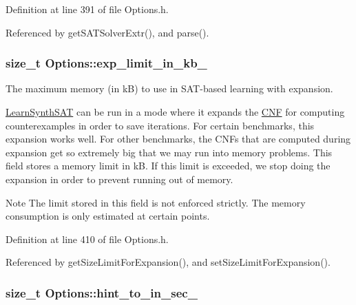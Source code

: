 Definition at line 391 of file Options.\-h.



Referenced by get\-S\-A\-T\-Solver\-Extr(), and parse().

\hypertarget{classOptions_a725d5329592e1dba55eb6a446807b3ce}{
\subsubsection[{exp\-\_\-limit\-\_\-in\-\_\-kb\-\_\-}]{\setlength{\rightskip}{0pt plus 5cm}size\-\_\-t Options\-::exp\-\_\-limit\-\_\-in\-\_\-kb\-\_\-\hspace{0.3cm}{\ttfamily [protected]}}}\label{classOptions_a725d5329592e1dba55eb6a446807b3ce}


The maximum memory (in k\-B) to use in S\-A\-T-\/based learning with expansion. 

\hyperlink{classLearnSynthSAT}{Learn\-Synth\-S\-A\-T} can be run in a mode where it expands the \hyperlink{classCNF}{C\-N\-F} for computing counterexamples in order to save iterations. For certain benchmarks, this expansion works well. For other benchmarks, the C\-N\-Fs that are computed during expansion get so extremely big that we may run into memory problems. This field stores a memory limit in k\-B. If this limit is exceeded, we stop doing the expansion in order to prevent running out of memory.

\begin{DoxyNote}{Note}
The limit stored in this field is not enforced strictly. The memory consumption is only estimated at certain points. 
\end{DoxyNote}


Definition at line 410 of file Options.\-h.



Referenced by get\-Size\-Limit\-For\-Expansion(), and set\-Size\-Limit\-For\-Expansion().

\hypertarget{classOptions_a830786e3337b2fca8d15d02496b25bde}{
\subsubsection[{hint\-\_\-to\-\_\-in\-\_\-sec\-\_\-}]{\setlength{\rightskip}{0pt plus 5cm}size\-\_\-t Options\-::hint\-\_\-to\-\_\-in\-\_\-sec\-\_\-\hspace{0.3cm}{\ttfamily [protected]}}}\label{classOptions_a830786e3337b2fca8d15d02496b25bde}


